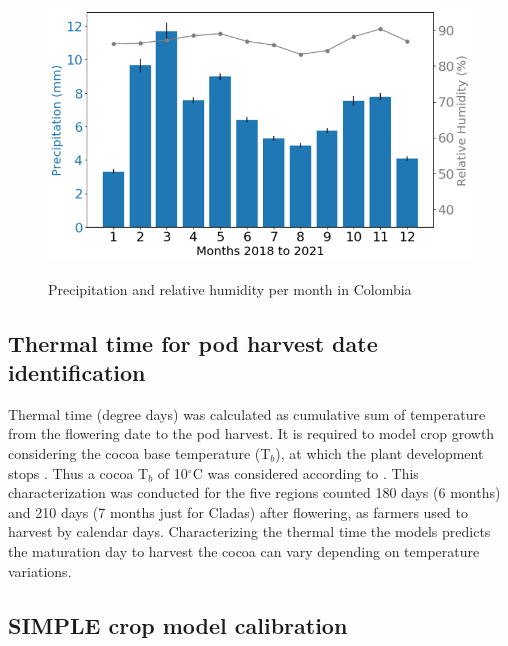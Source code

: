 \documentclass[gene,journal,article,submit,moreauthors,pdftex]{Definitions/mdpi}
\begin{document}
\begin{figure}[h!]
	\centering
	\caption{\footnotesize {Precipitation and relative humidity per month in Colombia \\}}
	\includegraphics[scale=0.4]{images/rainmonth.png}
	\label{fig:rain}
\end{figure}
\newpage

\subsection{Thermal time for pod harvest date identification}
Thermal time (degree days) was calculated as cumulative sum of temperature from the flowering date to the pod harvest. It is required to model crop growth  considering the cocoa base temperature (T$_{b}$), at which the plant development stops \citep{Ritchie1991}. Thus a cocoa T$_{b}$ of 10$^\circ$C was considered according to \cite{lahive2019}. This characterization was conducted for the five regions counted 180 days (6 months) and 210 days (7 months just for Cladas) after flowering, as farmers used to harvest by calendar days. Characterizing the thermal time the models predicts the maturation day to harvest the cocoa can vary depending on temperature variations.    


\subsection{SIMPLE crop model calibration}
\end{document}
